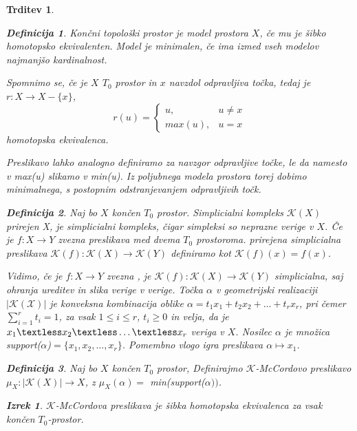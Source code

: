 \documentclass[a4paper,12pt]{article}
\theoremstyle{definition}
\newtheorem{definicija}{Definicija}
\theoremstyle{plain}
\newtheorem{izrek}{Izrek}
\theoremstyle{definition}
\theoremstyle{plain}
\newtheorem{trditev}{Trditev}
\theoremstyle{plain}
\theoremstyle{plain}
\theoremstyle{plain}
\begin{document}
\begin{trditev}
\begin{definicija}
    Končni topološki prostor je \textit{model} prostora $X$, če mu je šibko homotopsko ekvivalenten. Model je \textit{minimalen}, če ima izmed vseh modelov najmanjšo kardinalnost.
\end{definicija}

Spomnimo se, če je $X$ $T_0$ prostor in $x$ navzdol odpravljiva točka, tedaj je $r: X \rightarrow X - \{x\}$, $$
r(u) = \begin{cases}
    u, & u \neq x \\
    max(u), & u = x
\end{cases}$$
homotopska ekvivalenca.

Preslikavo lahko analogno definiramo za navzgor odpravljive točke, le da namesto v \textit{max(u)} slikamo v \textit{min(u)}. 
Iz poljubnega modela prostora torej dobimo minimalnega, s postopnim odstranjevanjem odpravljivih točk.


\begin{definicija}
    Naj bo $X$ končen $T_0$ prostor. \textit{Simplicialni kompleks} $\mathcal{K}(X)$ \textit{prirejen X}, je simplicialni kompleks, čigar simpleksi so neprazne verige v $X$. Če je $f: X\rightarrow Y$ zvezna preslikava med dvema $T_0$ prostoroma. \textit{prirejena simplicialna preslikava} $\mathcal{K}(f):\mathcal{K}(X) \rightarrow \mathcal{K}(Y)$ definiramo kot $\mathcal{K}(f)(x) = f(x)$.
\end{definicija}
Vidimo, če je $f: X\rightarrow Y$ zvezna , je $\mathcal{K}(f):\mathcal{K}(X) \rightarrow \mathcal{K}(Y)$ simplicialna, saj ohranja ureditev in slika verige v verige.
Točka $\alpha$ v geometrijski realizaciji $|\mathcal{K(X)}|$ je
konveksna kombinacija oblike
$\alpha = t_1x_1+t_2x_2 + \ldots + t_r x_r$, pri čemer 
$\sum_{i=1}^{r}t_i=1$, za vsak $1 \le i \le r$, $t_i \ge 0$ in 
velja, da je $x_1 \textless x_2 \textless \ldots \textless x_r$ veriga v $X$.
Nosilec $\alpha$ je množica \textit{support}($\alpha$)$= \{x_1,x_2,\ldots,x_r\}$. Pomembno vlogo igra 
 preslikava $\alpha \mapsto x_1$.
 
 \begin{definicija}
    Naj bo $X$ končen $T_0$ prostor, Definirajmo
    $\mathcal{K}$-\textit{McCordovo} preslikavo $\mu_X:|\mathcal{K}
    (X)|\rightarrow X$, z $\mu_X(\alpha) =$
    min(\textit{support}($\alpha))$.
\end{definicija}

\begin{izrek}
    $\mathcal{K}$-\textit{McCordova} preslikava je šibka homotopska 
    ekvivalenca za vsak končen $T_0$-prostor.
\end{izrek}



\end{trditev}
\end{document}
